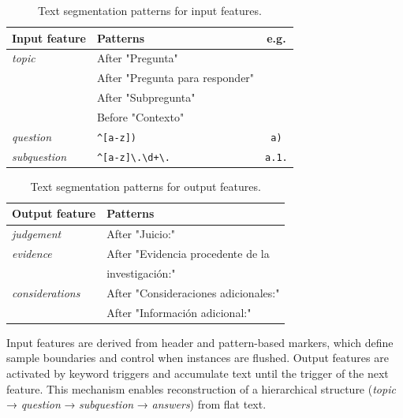 \documentclass[11pt,a4paper]{article}
\begin{document}
\begin{table}[H]
\centering
\small
\begin{tabular}{l|l|c}
\toprule
\textbf{Input feature} & \textbf{Patterns} & \textbf{e.g.} \\
\midrule
\textit{topic} & After "Pregunta" \\
      & After "Pregunta para responder" \\
      & After "Subpregunta" \\
      & Before "Contexto" \\
\midrule
\textit{question} & \texttt{\textasciicircum[a-z])} & \texttt{a)}  \\
\midrule
\textit{subquestion} & \texttt{\textasciicircum[a-z]\textbackslash.\textbackslash d+\textbackslash.} & \texttt{a.1.} \\
\bottomrule
\end{tabular}
\caption{Text segmentation patterns for input features.}
\label{tab:input_triggers}
\end{table}


\vspace{-0.2cm}

\begin{table}[H]
\centering
\small
\begin{tabular}{l|l}
\toprule
\textbf{Output feature} & \textbf{Patterns} \\
\midrule
\textit{judgement} & After "Juicio:" \\
\midrule
\textit{evidence} & After "Evidencia procedente de la \\
 &  investigación:" \\
 \midrule
\textit{considerations} & After "Consideraciones adicionales:" \\
               & After "Información adicional:" \\
\bottomrule
\end{tabular}
\caption{Text segmentation patterns for output features.}
\label{tab:output_triggers}
\end{table}

Input features are derived from header and pattern-based markers, which define sample boundaries and control when instances are flushed. Output features are activated by keyword triggers and accumulate text until the trigger of the next feature. This mechanism enables reconstruction of a hierarchical structure (\textit{topic} → \textit{question} → \textit{subquestion} → \textit{answers}) from flat text.
\end{document}
